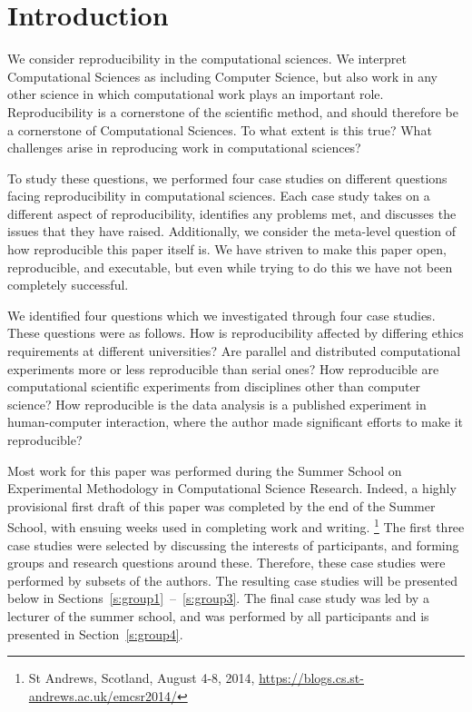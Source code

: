 \section{Introduction}
\label{s:intro}


We consider reproducibility in the computational sciences.  We interpret Computational Sciences as including Computer Science, but also 
work in any other science in which computational work plays an important role.
Reproducibility is a cornerstone of the scientific method, and should therefore be a cornerstone of Computational Sciences.  
To what extent is this true?  What challenges arise in reproducing work in computational sciences?  

To study these questions, we performed four case studies on different questions facing reproducibility in computational sciences.  
Each case study takes on a different aspect of reproducibility, identifies any problems met, and discusses the issues that they have raised.
Additionally, we consider the meta-level question of how reproducible this paper itself is.  We have striven to make this paper open, 
reproducible, and executable, but even while trying to do this we have not been completely successful.

We identified four questions which we investigated through four case studies.  
These questions were as follows. 
How is reproducibility affected by differing ethics requirements at different universities? 
Are parallel and distributed computational experiments more or less reproducible than serial ones?
How reproducible are computational scientific experiments from disciplines other than computer science?
How reproducible is the data analysis is a published experiment in human-computer interaction, where 
the author made significant efforts to make it reproducible?

Most work for this paper was performed 
during the Summer School
on Experimental Methodology in Computational Science Research.   Indeed, a highly provisional first draft of this paper was completed by the end of the Summer School, with ensuing weeks used in completing work and writing.  
\footnote{St Andrews, Scotland, August 4-8, 2014,
\url{https://blogs.cs.st-andrews.ac.uk/emcsr2014/}} 
The first three case studies were selected by discussing the interests of participants, and forming groups and research questions around these. 
Therefore, these case studies were performed by subsets of the authors. 
The resulting case studies will be presented below
in Sections~\ref{s:group1}~--~\ref{s:group3}.
The final case study was led by a lecturer of the summer school, and was performed by all participants
and is presented in Section~\ref{s:group4}.

